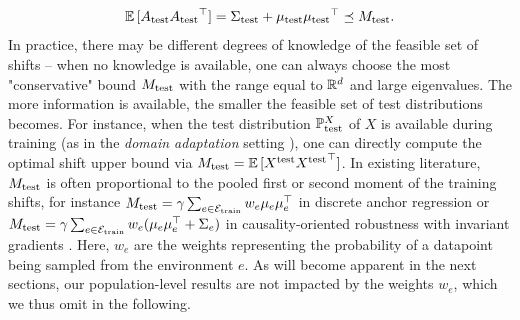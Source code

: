 \begin{align}\label{eqn:testAbound}
    \mathbb{E}\,[ A_{\text{test}} {A_{\text{test}}}^\top] = \Sigma_{\text{test}} + \mu_{\text{test}} {\mu_{\text{test}}}^\top \preceq M_{\mathrm{test}}.
\end{align}
In practice, there may be different degrees of knowledge of the feasible set of shifts -- when no knowledge is available, one can always choose the most "conservative" bound $M_{\mathrm{test}}$ with the range equal to $\mathbb{R}^{d}$ and large eigenvalues. The more information is available, the smaller the feasible set of test distributions becomes. For instance, when 
the test distribution 
$\mathbb{P}_{\text{test}}^X$
of $X$ is available during training (as in the \emph{domain adaptation} setting \cite{shimodaira2000improving}), one can directly compute the optimal shift upper bound via $M_{\mathrm{test}} =  \mathbb{E}\,[X^{\text{test}} {X^{\text{test}}}^\top] $.
In existing literature, $M_{\mathrm{test}}$ is often proportional to the pooled first or second moment of the training shifts, for instance $M_{\mathrm{test}} = \gamma \sum_{e \in \mathcal{E}_{\mathrm{train}}} w_e \mu_e \mu_e^\top$ in discrete anchor regression \cite{rothenhausler2021anchor} or $M_{\mathrm{test}} = \gamma \sum_{e \in \mathcal{E}_{\mathrm{train}}} w_e (\mu_e \mu_e^\top + \Sigma_e)$ in causality-oriented robustness with invariant gradients \cite{shen2023causalityoriented}.
Here, $w_e$ are the weights representing the probability of a datapoint being sampled from the environment $e$. As will become apparent in the next sections, our population-level results are not impacted by the weights $w_e$, which we thus omit in the following.

